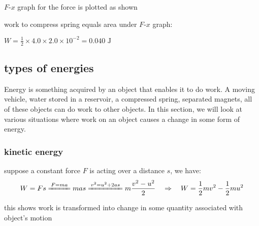 \begin{wrapfigure}{r}{0.36\textwidth}
	\vspace*{-12pt}
	\centering
	\vspace*{-16pt}
\end{wrapfigure}


\sol $F$-$x$ graph for the force is plotted as shown

work to compress spring equals area under $F$-$x$ graph:

{
	\centering
	
	$ W = \frac{1}{2} \times 4.0 \times 2.0 \times 10^{-2} = 0.040 \text{ J} $
	
	\vspace*{-\baselineskip} \eoe
	
}



\subsection{types of energies}\label{ch-KE}

Energy is something acquired by an object that enables it to do work. A moving vehicle, water stored in a reservoir, a compressed spring, separated magnets, all of these objects can do work to other objects. In this section, we will look at various situations where work on an object causes a change in some form of energy.


\subsubsection{kinetic energy}

suppose a constant force $F$ is acting over a distance $s$, we have:
\begin{equation*}
	W=Fs \xlongequal{F=ma} mas \xlongequal{v^2 = u^2 + 2as} m \frac{v^2-u^2}{2} \RA W = \frac{1}{2}mv^2 - \frac{1}{2}mu^2
\end{equation*}

this shows work is transformed into change in some quantity associated with object's motion

